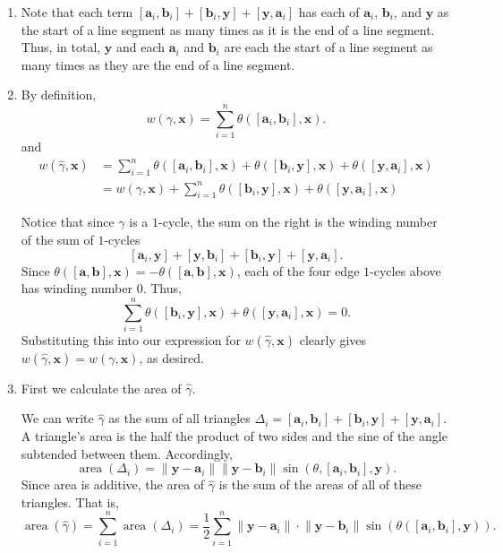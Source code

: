 \documentclass[12 pt, letterpaper]{hmcpset}
\begin{document}
\begin{solution}
	\begin{enumerate}
		\item Note that each term $[\mathbf{a}_{i}, \mathbf{b}_{i}] + [\mathbf{b}_{i}, \mathbf{y}] + [\mathbf{y}, \mathbf{a}_{i}]$ has each of $\mathbf{a}_{i}$, $\mathbf{b}_{i}$, and $\mathbf{y}$ as the start of a line segment as many times as it is the end of a line segment. Thus, in total, $\mathbf{y}$ and each $\mathbf{a}_{i}$ and $\mathbf{b}_{i}$ are each the start of a line segment as many times as they are the end of a line segment.
		\item By definition,
			\[
				w(\gamma, \mathbf{x}) = \sum_{i = 1}^{n} \theta([\mathbf{a}_{i}, \mathbf{b}_{i}], \mathbf{x}).
			\]
			and
			\begin{align*}
				w(\hat{\gamma}, \mathbf{x}) & = \sum_{i = 1}^{n} \theta([\mathbf{a}_{i}, \mathbf{b}_{i}], \mathbf{x}) + \theta([\mathbf{b}_{i}, \mathbf{y}], \mathbf{x}) + \theta([\mathbf{y}, \mathbf{a}_{i}], \mathbf{x}) \\
						      & = w(\gamma, \mathbf{x}) + \sum_{i = 1}^{n} \theta([\mathbf{b}_{i}, \mathbf{y}], \mathbf{x}) + \theta([\mathbf{y}, \mathbf{a}_{i}], \mathbf{x})
			\end{align*}

			Notice that since $\gamma$ is a $1$-cycle, the sum on the right is the winding number of the sum of $1$-cycles
			\[
				 [\mathbf{a}_{i}, \mathbf{y}] + [\mathbf{y}, \mathbf{b}_{i}] + [\mathbf{b}_{i}, \mathbf{y}] + [\mathbf{y}, \mathbf{a}_{i}].
			\]
			Since $\theta([\mathbf{a}, \mathbf{b}], \mathbf{x}) = - \theta([\mathbf{a}, \mathbf{b}], \mathbf{x})$, each of the four edge $1$-cycles above has winding number $0$.  Thus,
			\[
				\sum_{i = 1}^{n} \theta([\mathbf{b}_{i}, \mathbf{y}], \mathbf{x}) + \theta([\mathbf{y}, \mathbf{a}_{i}], \mathbf{x}) = 0.
			\]
			Substituting this into our expression for $w(\hat{\gamma}, \mathbf{x})$ clearly gives $w(\hat{\gamma}, \mathbf{x}) = w(\gamma, \mathbf{x})$, as desired.
		\item First we calculate the area of $\hat{\gamma}$. 

			We can write $\hat{\gamma}$ as the sum of all triangles $\Delta_{i} = [\mathbf{a}_{i}, \mathbf{b}_{i}] + [\mathbf{b}_{i}, \mathbf{y}] + [\mathbf{y}, \mathbf{a}_{i}]$. A triangle's area is the half the product of two sides and the sine of the angle subtended between them. Accordingly,
			\[
				\operatorname{area}(\Delta_{i}) = \lVert \mathbf{y} - \mathbf{a}_{i} \rVert \lVert \mathbf{y} - \mathbf{b}_{i} \rVert \sin{(\theta, [\mathbf{a}_{i}, \mathbf{b}_{i}], \mathbf{y})}.
			\]
			Since area is additive, the area of $\hat{\gamma}$ is the sum of the areas of all of these triangles. That is,
			\[
				\operatorname{area}(\hat{\gamma}) = \sum_{i = 1}^{n} \operatorname{area}(\Delta_{i}) = \frac{1}{2} \sum_{i = 1}^{n} \lVert \mathbf{y} - \mathbf{a}_{i} \rVert \cdot \lVert \mathbf{y} - \mathbf{b}_{i} \rVert \sin{(\theta([\mathbf{a}_{i}, \mathbf{b}_{i}], \mathbf{y}))}.
			\]


\end{enumerate}
\end{solution}
\end{document}

